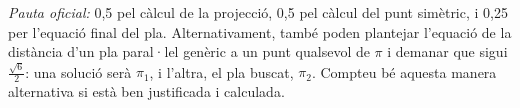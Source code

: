 \begin{apartats}
\begin{solucio}
\textit{Pauta oficial:} 0,5 pel càlcul de la projecció, 0,5 pel càlcul del punt simètric, i 0,25 per l'equació
final del pla. Alternativament, també poden plantejar l'equació de la distància d'un pla paral·lel genèric a un
punt qualsevol de $\pi$ i demanar que sigui $\frac{\sqrt6}{2}$: una solució serà $\pi_1$, i l'altra, el pla
buscat, $\pi_2$. Compteu bé aquesta manera alternativa si està ben justificada i calculada.
\end{solucio}

\end{apartats}
